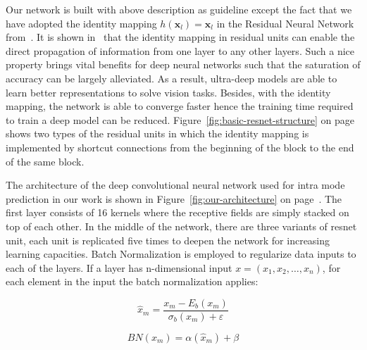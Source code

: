 Our network is built with above description as guideline except the 
fact that we have adopted the identity mapping 
\(h(\mathbf{x}_l)=\mathbf{x}_l\) in the Residual 
Neural Network from~\parencite{RN67}.
It is shown in~\parencite{RN68} that
the identity mapping in residual units
can enable the direct propagation of information
from one layer to any other layers.
Such a nice property brings vital benefits
for deep neural networks such that the saturation of accuracy
can be largely alleviated.
As a result, ultra-deep models are able to
learn better representations to solve
vision tasks.
Besides, with the identity mapping, the network
is able to converge faster hence the training time
required to train a deep model can be reduced.
Figure~\ref{fig:basic-resnet-structure} on 
page~\pageref{fig:basic-resnet-structure}
shows two types
of the residual units in which the identity mapping
is implemented by shortcut connections from 
the beginning of the block
to the end of the same block.

The architecture of the deep convolutional neural 
network used for intra mode prediction in our work
is shown in Figure~\ref{fig:our-architecture} on
page~\pageref{fig:our-architecture}.
The first layer consists of 16 kernels where
the receptive fields are 
simply stacked on top of each other.
In the middle of the network, there are
three variants of resnet unit, each unit
is replicated five times to deepen the network
for increasing learning capacities.
Batch Normalization is employed to regularize
data inputs to each of the layers.
If a layer has n-dimensional input
\(x = (x_1, x_2, \ldots, x_n)\),
for each element in the input the batch 
normalization applies:

\begin{equation} 
    {\hat x_m} = \frac{x_m - E_b(x_m)}{\sigma_b(x_m) + \varepsilon} \label{eqa:batchnormone}
\end{equation}

\begin{equation} 
    BN(x_m) = \alpha (\hat x_m) + \beta \label{eqa:batchnormtwo}
\end{equation}

